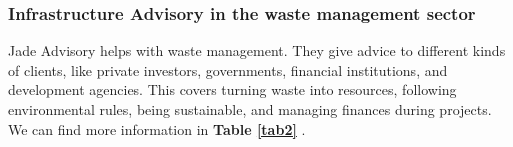 \subsubsection*{Infrastructure Advisory in the waste management sector} 
Jade Advisory helps with waste management. They give advice to different kinds of clients, like private investors, governments, financial institutions, and development agencies. This covers turning waste into resources, following environmental rules, being sustainable, and managing finances during projects. We can find more information in \textbf{Table \ref{tab2} }.

